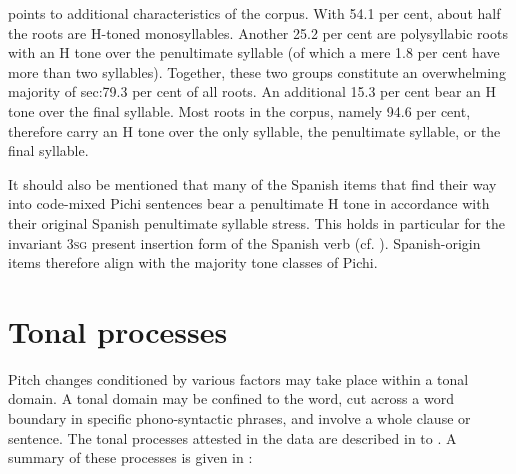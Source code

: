  points to additional characteristics of the corpus. With 54.1 per cent, about half the roots are H-toned monosyllables. Another 25.2 per cent are polysyllabic roots with an H tone over the penultimate syllable (of which a mere 1.8 per cent have more than two syllables). Together, these two groups constitute an overwhelming majority of sec:79.3 per cent of all roots. An additional 15.3 per cent bear an H tone over the final syllable. Most roots in the corpus, namely 94.6 per cent, therefore carry an H tone over the only syllable, the penultimate syllable, or the final syllable.

It should also be mentioned that many of the Spanish items that find their way into code-mixed Pichi sentences bear a penultimate H tone in accordance with their original Spanish penultimate syllable stress. This holds in particular for the invariant \textsc{3sg} present insertion form of the Spanish verb (cf. ). Spanish-origin items therefore align with the majority tone classes of Pichi.  


\section{Tonal processes}\label{sec:3.2}

Pitch changes conditioned by various factors may take place within a tonal domain. A tonal domain may be confined to the word, cut across a word boundary in specific phono-syntactic phrases, and involve a whole clause or sentence. The tonal processes attested in the data are described in  to . A summary of these processes is given in :

